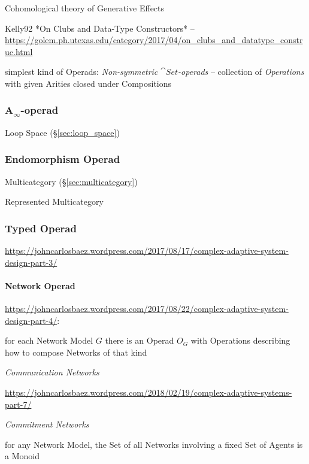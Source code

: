 Cohomological theory of Generative Effects


Kelly92 *On Clubs and Data-Type Constructors* --
\url{https://golem.ph.utexas.edu/category/2017/04/on_clubs_and_datatype_construc.html}

simplest kind of Operads: \emph{Non-symmetric $\cat{Set}$-operads} --
collection of \emph{Operations} with given Arities closed under
Compositions



\subsubsection{A$_\infty$-operad}\label{sec:a_infinity_operad}

Loop Space (\S\ref{sec:loop_space})



\subsubsection{Endomorphism Operad}\label{sec:endomorphism_operad}

Multicategory (\S\ref{sec:multicategory})

Represented Multicategory



\subsubsection{Typed Operad}\label{sec:typed_operad}

\url{https://johncarlosbaez.wordpress.com/2017/08/17/complex-adaptive-system-design-part-3/}



\paragraph{Network Operad}\label{sec:network_operad}\hfill

\url{https://johncarlosbaez.wordpress.com/2017/08/22/complex-adaptive-system-design-part-4/}:

for each Network Model $G$ there is an Operad $O_G$ with Operations describing
how to compose Networks of that kind

\emph{Communication Networks}

\url{https://johncarlosbaez.wordpress.com/2018/02/19/complex-adaptive-systems-part-7/}

\emph{Commitment Networks}

for any Network Model, the Set of all Networks involving a fixed Set of Agents
is a Monoid

